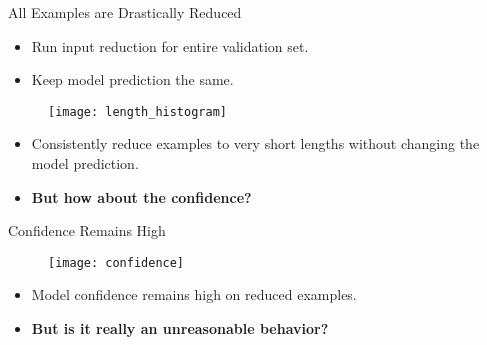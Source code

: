 \begin{frame}{All Examples are Drastically Reduced}
\begin{itemize}
	\item Run input reduction for entire validation set.
	\item Keep model prediction the same.
\end{itemize}
\pause
\begin{figure}
\centering
\texttt{[image: length\_histogram]}
\end{figure}
\begin{itemize}
\item Consistently reduce examples to very short lengths without changing the model prediction. \pause
\item \textbf{But how about the confidence?}
\end{itemize}
\end{frame}

\begin{frame}{Confidence Remains High}
\begin{figure}
\centering
\texttt{[image: confidence]}
\end{figure}
\begin{itemize}
\item Model confidence remains high on reduced examples. \pause
\item \textbf{But is it really an unreasonable behavior?}
\end{itemize}
\end{frame}

